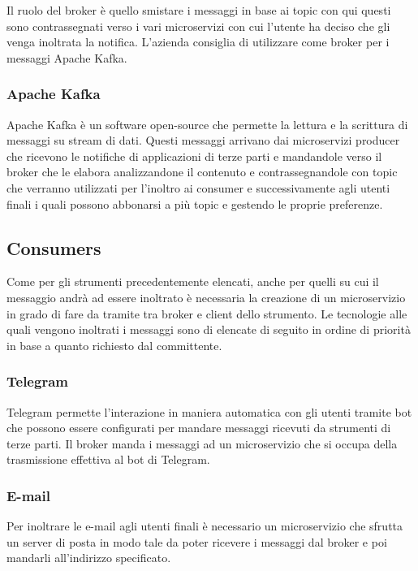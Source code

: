 		Il ruolo del broker è quello smistare i messaggi in base ai topic con qui questi sono contrassegnati verso i vari microservizi con cui l'utente ha deciso che gli venga inoltrata la notifica.
		L'azienda consiglia di utilizzare come broker per i messaggi Apache Kafka.
	
		\subsubsection{Apache Kafka}
		Apache Kafka è un software open-source che permette la lettura e la scrittura di messaggi su stream di dati.
		Questi messaggi arrivano dai microservizi producer che ricevono le notifiche di applicazioni di terze parti e mandandole verso il broker che le elabora analizzandone il contenuto e contrassegnandole con topic che verranno utilizzati per l'inoltro ai consumer e successivamente agli utenti finali i quali possono abbonarsi a più topic e gestendo le proprie preferenze.
		
	
	\subsection{Consumers}
		Come per gli strumenti precedentemente elencati, anche per quelli su cui il messaggio andrà ad essere inoltrato è necessaria la creazione di un microservizio in grado di fare da tramite tra broker e client dello strumento.
		Le tecnologie alle quali vengono inoltrati i messaggi sono di elencate di seguito in ordine di priorità in base a quanto richiesto dal committente.
			
		\subsubsection{Telegram}
		Telegram permette l'interazione in maniera automatica con gli utenti tramite bot che possono essere configurati per mandare messaggi ricevuti da strumenti di terze parti.
		Il broker manda i messaggi ad un microservizio che si occupa della trasmissione effettiva al bot di Telegram.
		
		\subsubsection{E-mail}
		Per inoltrare le e-mail agli utenti finali è necessario un microservizio che sfrutta un server di posta in modo tale da poter ricevere i messaggi dal broker e poi mandarli all'indirizzo specificato.
		
